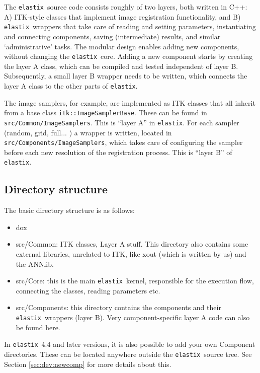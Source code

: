 \documentclass[]{report}
\newcommand{\elastix}{\texttt{elastix}}
\begin{document}
The \elastix\ source code consists roughly of two layers, both
written in C++: A) ITK-style classes that implement image
registration functionality, and B) \elastix\ wrappers that take care
of reading and setting parameters, instantiating and connecting
components, saving (intermediate) results, and similar
`administrative' tasks. The modular design enables adding new
components, without changing the \elastix\ core. Adding a new
component starts by creating the layer A class, which can be
compiled and tested independent of layer B. Subsequently, a small
layer B wrapper needs to be written, which connects the layer A
class to the other parts of \elastix.

The image samplers, for example, are implemented as ITK classes that all
inherit from a base class \texttt{itk::ImageSamplerBase}. These can be found in
\texttt{src/Common/ImageSamplers}. This is ``layer A'' in \elastix. For each
sampler (random, grid, full... ) a wrapper is written, located in
\texttt{src/Components/ImageSamplers}, which takes care of configuring the
sampler before each new resolution of the registration process. This is ``layer
B'' of \elastix.

\subsection{Directory structure}

The basic directory structure is as follows:
\begin{itemize}
\item dox
\item src/Common: ITK classes, Layer A stuff. This directory also contains
    some external libraries, unrelated to ITK, like xout (which is written
    by us) and the ANNlib.
\item src/Core: this is the main \elastix\ kernel, responsible for the
    execution flow, connecting the classes, reading parameters etc.
\item src/Components: this directory contains the components and their
    \elastix\ wrappers (layer B). Very component-specific layer A code can
    also be found here.
\end{itemize}

In \elastix\ 4.4 and later versions, it is also possible to add your own
Component directories. These can be located anywhere outside the \elastix\
source tree. See Section \ref{sec:dev:newcomp} for more details about this.
\end{document}
